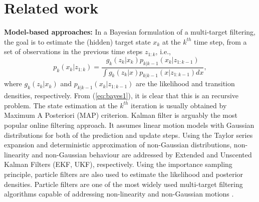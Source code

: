 \documentclass[runningheads]{llncs}
\begin{document}
\section{Related work}
\label{sec:relwork}

\noindent \textbf{{Model-based approaches:}}
In a Bayesian formulation of a multi-target filtering, the goal is to estimate the (hidden) target state $x_{k}$ at the $k^{th}$ time step, from a set of observations in the previous time steps $z_{1:k}$, {i.e.},
\begin{equation}
p_k(x_k|z_{1:k}) = \frac{g_k(z_k|x_k)p_{k|k-1}(x_k|z_{1:k-1})}{\int g_k(z_k|x)p_{k|k-1}(x|z_{1:k-1})dx},
\label{eq:bayes1}
\end{equation} 
\noindent where $g_k(z_k|x_k)$ and $p_{k|k-1}(x_k|z_{1:k-1})$ are the likelihood and transition densities, respectively. From (\ref{eq:bayes1}), it is clear that this is an recursive problem. The state estimation at the $k^{th}$ iteration is usually obtained by Maximum A Posteriori (MAP) criterion.
Kalman filter is arguably the most popular online filtering approach. It assumes linear motion models with Gaussian distributions for both of the prediction and update steps. Using the Taylor series expansion and deterministic approximation of non-Gaussian distributions, non-linearity and non-Gaussian behaviour are addressed by Extended and Unscented Kalman Filters {(EKF, UKF)}, respectively. Using the importance sampling principle, particle filters are also used to estimate the likelihood and posterior densities. Particle filters are one of the most widely used multi-target filtering algorithms capable of addressing non-linearity and non-Gaussian motions \cite{Vo:2003,Vo:2005}.
\end{document}
